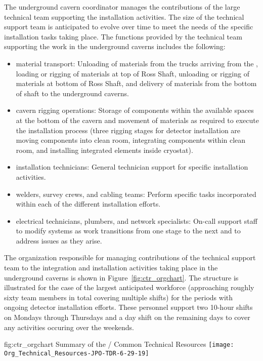 The underground cavern coordinator manages the contributions of 
the large technical team supporting the installation activities.
The size of the technical support team is anticipated to evolve  
over time to meet the needs of the specific installation tasks 
taking place.  The functions provided by the technical team 
supporting the work in the underground caverns includes the
following:
\begin{itemize}
  \item {material transport:} Unloading of materials from the 
        trucks arriving from the , loading or rigging 
        of materials at top of Ross Shaft, unloading or rigging 
        of materials at bottom of Ross Shaft, and delivery of 
        materials from the bottom of shaft to the underground 
        caverns.        
  \item {cavern rigging operations:}  Storage of 
        components within the available spaces at the bottom 
        of the cavern and movement of materials as required to 
        execute the installation process (three rigging stages
        for detector installation are moving components into 
        clean room, integrating components within clean room, 
        and installing integrated elements inside cryostat).
  \item {installation technicians:}  General technician 
        support for specific installation activities. 
  \item {welders, survey crews, and cabling teams:}  Perform 
        specific tasks incorporated within each of the different 
        installation efforts.
  \item {electrical technicians, plumbers, and network 
        specialists:}  On-call support staff to modify systems 
        as work transitions from one stage to the next and to 
        address issues as they arise.             
\end{itemize}   
    
The organization responsible for managing contributions of 
the technical support team to the integration and installation 
activities taking place in the underground caverns is shown 
in Figure~\ref{fig:ctr_orgchart}.  The structure is illustrated
for the case of the largest anticipated workforce (approaching 
roughly sixty team members in total covering multiple shifts) 
for the periods with ongoing detector installation efforts.
These personnel support two 10-hour shifts on Mondays through 
Thursdays and a day shift on the remaining days to cover 
any activities occuring over the weekends. 
\begin{dunefigure}{fig:ctr_orgchart}
  {Summary of the / Common Technical Resources}
  \texttt{[image: Org\_Technical\_Resources-JPO-TDR-6-29-19]}
\end{dunefigure}

